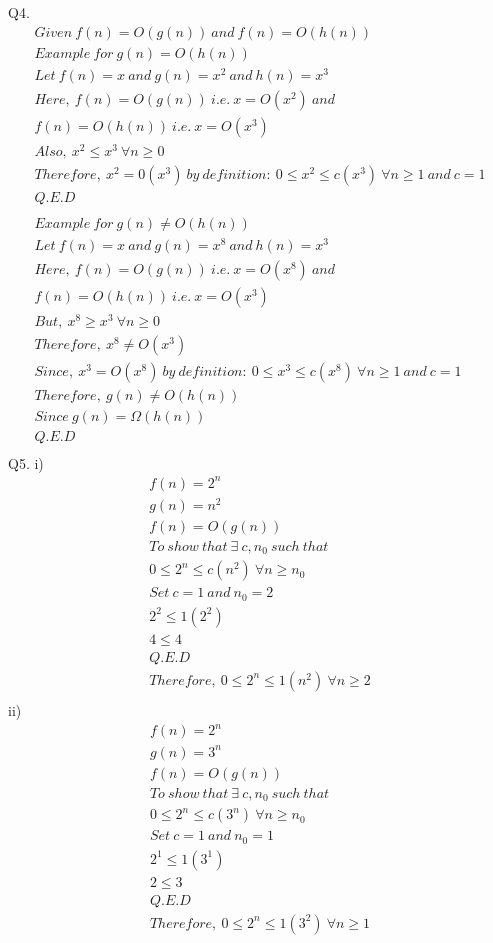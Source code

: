 \documentclass{article}
\begin{document}
Q4.
\begin{align*}
Given~{} f(n) = O(g(n))~{} and~{} f(n) = O(h(n)) \\
Example~{} for~{} g(n) = O(h(n))\\
Let~{} f(n) = x~{} and~{} g(n) = x^2~{} and~{} h(n) = x^3 \\
Here,~{} f(n) = O(g(n))~{} i.e.~{} x=O(x^2)~{} and\\
f(n) = O(h(n))~{} i.e.~{} x=O(x^3)\\
Also,~{}x^2 \leq x^3~{} \forall n \geq 0\\
Therefore,~{} x^2=0(x^3)~{} by~{} definition:~{}0 \leq x^2 \leq c(x^3)~{} \forall n \geq 1~{} and~{} c=1\\
Q.E.D\\
\\
Example~{} for~{} g(n) \neq O(h(n)) \\
Let~{} f(n) = x~{} and~{} g(n) = x^8~{} and~{} h(n) = x^3 \\
Here,~{} f(n) = O(g(n))~{} i.e.~{} x=O(x^8)~{} and\\
f(n) = O(h(n))~{} i.e.~{} x=O(x^3)\\
But,~{}x^8 \geq x^3~{} \forall n \geq 0\\
Therefore,~{} x^8 \neq O(x^3)~{} \\
Since,~{} x^3 = O(x^8)~{} by~{} definition:~{}0 \leq x^3 \leq c(x^8)~{} \forall n \geq 1~{} and~{} c=1\\
Therefore,~{} g(n) \neq O(h(n))\\
Since~{} g(n)=\Omega(h(n))\\
Q.E.D\\
\end{align*}	
Q5.
i)
\begin{align*}
f(n) = 2^n \\
g(n) = n^2 \\
f(n) = O(g(n)) \\
To~{} show~{} that~{} \exists~{} c,n_0~{}	such~{} that~{}\\
0 \leq 2^n \leq c(n^2)~{} \forall n\geq n_0\\ 
Set~{} c=1~{} and~{} n_0 = 2 \\
2^2 \leq 1(2^2) \\
4\leq 4 \\
Q.E.D  \\
Therefore,~{} 0 \leq 2^n \leq 1(n^2)~{} \forall n\geq 2\\
\end{align*}
ii)
\begin{align*}
f(n) = 2^n \\
g(n) = 3^n \\
f(n) = O(g(n)) \\
To~{} show~{} that~{} \exists~{} c,n_0~{}	such~{} that~{}\\
0 \leq 2^n \leq c(3^n)~{} \forall n\geq n_0\\ 
Set~{} c=1~{} and~{} n_0 = 1 \\
2^1 \leq 1(3^1) \\
2\leq 3 \\
Q.E.D  \\
Therefore,~{} 0 \leq 2^n \leq 1(3^2)~{} \forall n\geq 1\\
\end{align*}
\end{document}
